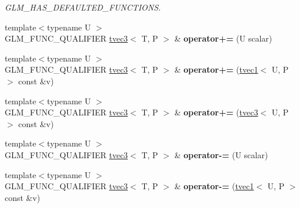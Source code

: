 \begin{DoxyCompactItemize}
\begin{DoxyCompactList}\small\item\em G\-L\-M\-\_\-\-H\-A\-S\-\_\-\-D\-E\-F\-A\-U\-L\-T\-E\-D\-\_\-\-F\-U\-N\-C\-T\-I\-O\-N\-S. \end{DoxyCompactList}\item 
\hypertarget{structglm_1_1tvec3_a447912153d202969d9f5103af75d581d}{{\footnotesize template$<$typename U $>$ }\\G\-L\-M\-\_\-\-F\-U\-N\-C\-\_\-\-Q\-U\-A\-L\-I\-F\-I\-E\-R \hyperlink{structglm_1_1tvec3}{tvec3}$<$ T, P $>$ \& {\bfseries operator+=} (U scalar)}\label{structglm_1_1tvec3_a447912153d202969d9f5103af75d581d}

\item 
\hypertarget{structglm_1_1tvec3_a26a3f96b23e7f5d59992c65a48dbb01d}{{\footnotesize template$<$typename U $>$ }\\G\-L\-M\-\_\-\-F\-U\-N\-C\-\_\-\-Q\-U\-A\-L\-I\-F\-I\-E\-R \hyperlink{structglm_1_1tvec3}{tvec3}$<$ T, P $>$ \& {\bfseries operator+=} (\hyperlink{structglm_1_1tvec1}{tvec1}$<$ U, P $>$ const \&v)}\label{structglm_1_1tvec3_a26a3f96b23e7f5d59992c65a48dbb01d}

\item 
\hypertarget{structglm_1_1tvec3_a8c4047ef94643db0f346827041366fd2}{{\footnotesize template$<$typename U $>$ }\\G\-L\-M\-\_\-\-F\-U\-N\-C\-\_\-\-Q\-U\-A\-L\-I\-F\-I\-E\-R \hyperlink{structglm_1_1tvec3}{tvec3}$<$ T, P $>$ \& {\bfseries operator+=} (\hyperlink{structglm_1_1tvec3}{tvec3}$<$ U, P $>$ const \&v)}\label{structglm_1_1tvec3_a8c4047ef94643db0f346827041366fd2}

\item 
\hypertarget{structglm_1_1tvec3_aa8e58a178c28d5e2283600de3cfed096}{{\footnotesize template$<$typename U $>$ }\\G\-L\-M\-\_\-\-F\-U\-N\-C\-\_\-\-Q\-U\-A\-L\-I\-F\-I\-E\-R \hyperlink{structglm_1_1tvec3}{tvec3}$<$ T, P $>$ \& {\bfseries operator-\/=} (U scalar)}\label{structglm_1_1tvec3_aa8e58a178c28d5e2283600de3cfed096}

\item 
\hypertarget{structglm_1_1tvec3_a5faeb262b3d7bdc7c56fbb582ef6ee5a}{{\footnotesize template$<$typename U $>$ }\\G\-L\-M\-\_\-\-F\-U\-N\-C\-\_\-\-Q\-U\-A\-L\-I\-F\-I\-E\-R \hyperlink{structglm_1_1tvec3}{tvec3}$<$ T, P $>$ \& {\bfseries operator-\/=} (\hyperlink{structglm_1_1tvec1}{tvec1}$<$ U, P $>$ const \&v)}\label{structglm_1_1tvec3_a5faeb262b3d7bdc7c56fbb582ef6ee5a}


\end{DoxyCompactItemize}
